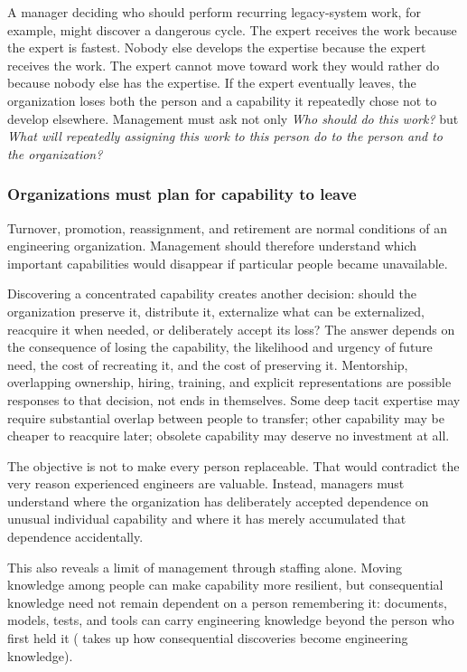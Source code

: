 A manager deciding who should perform recurring legacy-system work, for example, might discover a
dangerous cycle. The expert receives the work because the expert is fastest. Nobody else develops
the expertise because the expert receives the work. The expert cannot move toward work they would
rather do because nobody else has the expertise. If the expert eventually leaves, the organization
loses both the person and a capability it repeatedly chose not to develop elsewhere. Management
must ask not only \emph{Who should do this work?} but \emph{What will repeatedly assigning this work to this
person do to the person and to the organization?}

\subsubsection{Organizations must plan for capability to leave}\label{sec-capability-leaves}

Turnover, promotion, reassignment, and retirement are normal conditions of an engineering
organization. Management should therefore understand which important capabilities would disappear
if particular people became unavailable.

Discovering a concentrated capability creates another decision: should the organization preserve
it, distribute it, externalize what can be externalized, reacquire it when needed, or deliberately
accept its loss? The answer depends on the consequence of losing the capability, the likelihood and
urgency of future need, the cost of recreating it, and the cost of preserving it. Mentorship,
overlapping ownership, hiring, training, and explicit representations are possible responses to
that decision, not ends in themselves. Some deep tacit expertise may require substantial overlap
between people to transfer; other capability may be cheaper to reacquire later; obsolete capability
may deserve no investment at all.

The objective is not to make every person replaceable. That would contradict the very reason
experienced engineers are valuable. Instead, managers must understand where the organization has
deliberately accepted dependence on unusual individual capability and where it has merely
accumulated that dependence accidentally.

This also reveals a limit of management through staffing alone. Moving knowledge among people can
make capability more resilient, but consequential knowledge need not remain dependent on a person
remembering it: documents, models, tests, and tools can carry engineering knowledge beyond the
person who first held it (\citet{ch-engineering-knowledge} takes up how consequential discoveries become
engineering knowledge).

